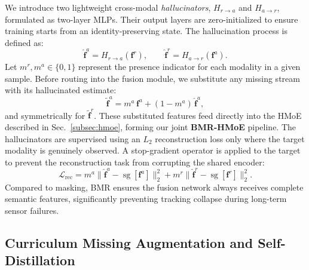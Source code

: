 We introduce two lightweight cross-modal \emph{hallucinators}, $H_{r\rightarrow a}$ and $H_{a\rightarrow r}$, formulated as two-layer MLPs. Their output layers are zero-initialized to ensure training starts from an identity-preserving state. The hallucination process is defined as:
\begin{equation}
  \hat{\mathbf{f}}^{a}=H_{r\rightarrow a}(\mathbf{f}^{r}),\qquad
  \hat{\mathbf{f}}^{r}=H_{a\rightarrow r}(\mathbf{f}^{a}).
  \label{eq:hallucinate}
\end{equation}
Let $m^{r},m^{a}\!\in\!\{0,1\}$ represent the presence indicator for each modality in a given sample. Before routing into the fusion module, we substitute any missing stream with its hallucinated estimate:
\begin{equation}
  \tilde{\mathbf{f}}^{a}=m^{a}\,\mathbf{f}^{a}+(1-m^{a})\,\hat{\mathbf{f}}^{a},
  \label{eq:substitute}
\end{equation}
and symmetrically for $\tilde{\mathbf{f}}^{r}$. These substituted features feed directly into the HMoE described in Sec.~\ref{subsec:hmoe}, forming our joint \textbf{BMR-HMoE} pipeline. The hallucinators are supervised using an $L_2$ reconstruction loss only where the target modality is genuinely observed. A stop-gradient operator is applied to the target to prevent the reconstruction task from corrupting the shared encoder:
\begin{equation}
  \mathcal{L}_{\text{rec}} = m^{a}\big\|\hat{\mathbf{f}}^{a}-\operatorname{sg}[\mathbf{f}^{a}]\big\|_2^2 + m^{r}\big\|\hat{\mathbf{f}}^{r}-\operatorname{sg}[\mathbf{f}^{r}]\big\|_2^2.
  \label{eq:rec-loss}
\end{equation}
Compared to masking, BMR ensures the fusion network always receives complete semantic features, significantly preventing tracking collapse during long-term sensor failures.

\subsection{Curriculum Missing Augmentation and Self-Distillation}
\label{subsec:cma}

